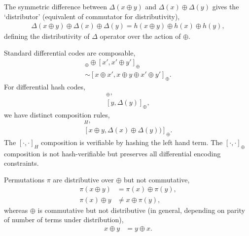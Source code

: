 \documentclass[twocolumn, aps, amsmath, amssymb, nofootinbib, superscriptaddress, longbibliography, doublefloatfix, table-of-contents, eqsecnum, rmp]{revtex4-2}
\begin{document}



The symmetric difference between $\Delta(x\oplus y)$ and $\Delta(x)\oplus\Delta(y)$ gives the `distributor' (equivalent of commutator for distributivity),
\begin{align}
	\Delta(x\oplus y)\oplus \Delta(x)\oplus \Delta(y) = h(x\oplus y) \oplus h(x)\oplus h(y),
\end{align}
defining the distributivity of $\Delta$ operator over the action of $\oplus$.

Standard differential codes are composable,
\begin{align}
	[x,x\oplus y)]_\oplus \oplus [x',x'\oplus y']_\oplus\nonumber\\
	\sim [x\oplus x', x\oplus y \oplus x' \oplus y']_\oplus.
\end{align}
For differential hash codes,
\begin{align}
	[x,\Delta(x)]_\oplus,\nonumber\\
	[y,\Delta(y)]_\oplus,
\end{align}
we have distinct composition rules,
\begin{align}
	[x\oplus y,\Delta(x\oplus y)]_H,\nonumber\\
	[x\oplus y,\Delta(x) \oplus \Delta(y))]_\oplus.
\end{align}
The $[\cdot,\cdot]_H$ composition is verifiable by hashing the left hand term. The $[\cdot,\cdot]_\oplus$ composition is not hash-verifiable but preserves all differential encoding constraints.

Permutations $\pi$ are distributive over $\oplus$ but not commutative,
\begin{align}
	\pi(x\oplus y) &= \pi(x) \oplus \pi(y),\nonumber\\
	\pi(x) \oplus y &\neq x \oplus \pi(y),
\end{align}
whereas $\oplus$ is commutative but not distributive (in general, depending on parity of number of terms under distribution),
\begin{align}
	x\oplus y &= y \oplus x.
\end{align}
\end{document}
